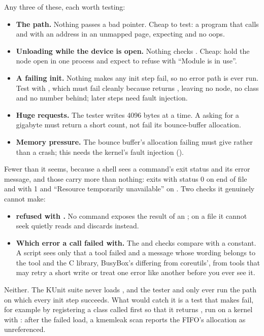  Any three of these, each worth testing:
\begin{itemize}
  \item \textbf{The  path.} Nothing passes a bad pointer. Cheap to test: a program
    that calls  and  with an address in an unmapped page, expecting
     and no oops.
  \item \textbf{Unloading while the device is open.} Nothing checks . Cheap: hold the
    node open in one process and expect  to refuse with ``Module is in use''.
  \item \textbf{A failing init.} Nothing makes any init step fail, so no error path is ever run.
    Test with , which must fail cleanly because
     returns , leaving no node, no class and no number behind;
    later steps need fault injection.
  \item \textbf{Huge requests.} The tester writes 4096 bytes at a time. A  asking for a
    gigabyte must return a short count, not fail its bounce-buffer allocation.
  \item \textbf{Memory pressure.} The bounce buffer's allocation failing must give 
    rather than a crash; this needs the kernel's fault injection ().
\end{itemize}

 Fewer than it seems, because a shell sees a command's exit status and its error message,
and those carry more than nothing:  exits with status 0 on end of file and with 1 and
``Resource temporarily unavailable'' on . Two checks it genuinely cannot make:
\begin{itemize}
  \item \textbf{ refused with .} No command exposes the result of an
    ;  on a file it cannot seek quietly reads and discards instead.
  \item \textbf{Which error a call failed with.} The  and  checks
    compare  with a constant. A script sees only that a tool failed and a message whose
    wording belongs to the tool and the C library, BusyBox's differing from coreutils', from tools
    that may retry a short write or treat one error like another before you ever see it.
\end{itemize}

 Neither. The KUnit suite never loads , and the tester and 
only ever run the path on which every init step succeeds. What would catch it is a test that makes
 fail, for example by registering a class called  first so that
it returns , run on a kernel with : after the failed
load, a kmemleak scan reports the FIFO's allocation as unreferenced.

